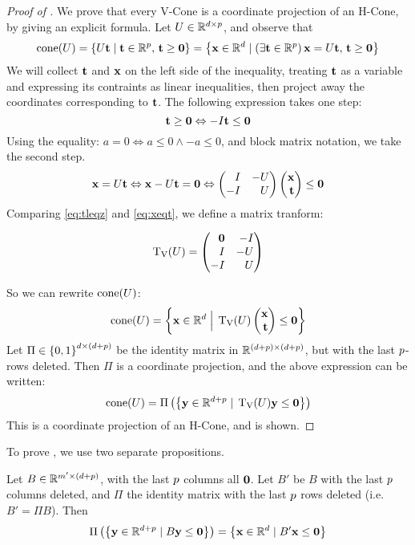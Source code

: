 \begin{proof}[Proof of ]
	We prove that every V-Cone is a coordinate projection of an H-Cone, by giving an explicit formula.  Let ${U \in \mathbb{R}^{d\times p}}$, and observe that
	\[ \operatorname{cone}(U) = \left\{U\mathbf{t} \;|\; \mathbf{t} \in \mathbb{R}^{p},\, \mathbf{t} \geq \mathbf{0}\right\} =
		\left\{\mathbf{x} \in \mathbb{R}^d \;|\; (\exists \mathbf{t} \in \mathbb{R}^{p})\,\mathbf{x} = U\mathbf{t},\, \mathbf{t} \geq \mathbf{0}\right\} \]
	We will collect $\mathbf{t}$ and $\mathbf{x}$ on the left side of the inequality, treating $\mathbf{t}$ as a variable and expressing its contraints as linear inequalities, then project away the coordinates corresponding to $\mathbf{t}$.  The following expression takes one step:
	\begin{equation}\label{eq:tleqz}
		\mathbf{t} \geq \mathbf{0} \Leftrightarrow -I\mathbf{t} \leq \mathbf{0}
	\end{equation}
	Using the equality: $a = 0 \Leftrightarrow a \leq 0 \land -a \leq 0$, and block matrix notation, we take the second step.
	\begin{equation}\label{eq:xeqt}
		\x = U\t \Leftrightarrow \x - U\t = \0 \Leftrightarrow
		\begin{pmatrix*}[r] I & -U \\ -I & U \end{pmatrix*} \xt \leq \0
	\end{equation}
	Comparing \eqref{eq:tleqz} and \eqref{eq:xeqt}, we define a matrix tranform:
  \begin{Transform}\label{vconelift_transform}
  \[\VLift(U) = \pmb \0 & -I \\ I & -U \\ -I & U \pme \]
  \end{Transform}
  So we can rewrite $\operatorname{cone}(U)$:
	\begin{equation*}
		\cone(U) = \set{ \xv \St \VLift(U)\xt \leq \0}
	\end{equation*}
	Let $\Pi \in \left\{0,1\right\}^{d\times(d+p)}$ be the identity matrix in $\mathbb{R}^{(d+p)\times(d+p)}$, but with the last $p$-rows deleted.  Then $\Pi$ is a coordinate projection, and the above expression can be written:
	\begin{equation}\label{eq:vconelift}
		\operatorname{cone}(U) = \Pi\left(\left\{ \mathbf{y} \in \mathbb{R}^{d+p} \;|\; \operatorname{T_V}(U)\mathbf{y} \leq \mathbf{0}\right\}\right)
	\end{equation}
	This is a coordinate projection of an H-Cone, and  is shown.
\end{proof}

To prove , we use two separate propositions.
\begin{Prop}\label{proj_0_columns}
	Let $B\in\mathbb{R}^{m'\times(d+p)}$, with the last $p$ columns all $\mathbf{0}$.  Let $B'$ be $B$ with the last $p$ columns deleted, and $\Pi$ the identity matrix with the last $p$ rows deleted (i.e. $B' = \Pi B$).  Then
	\[ \Pi\left(\left\{\mathbf{y} \in \mathbb{R}^{d+p} \;|\; B\mathbf{y} \leq \mathbf{0}\right\}\right) =
		\left\{\mathbf{x}\in\mathbb{R}^d\;|\; B'\mathbf{x}\leq\mathbf{0}\right\} \]
\end{Prop}

